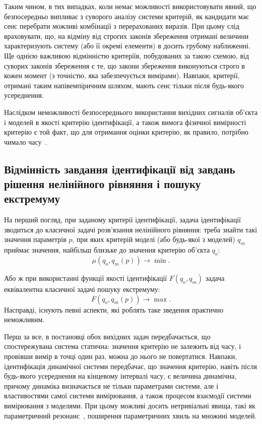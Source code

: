 Таким чином, в тих випадках, коли немає можливості
використовувати явний, що безпосередньо випливає з суворого
аналізу системи критерій, як кандидати має сенс перебрати
можливі комбінації з перерахованих виразів. При цьому слід
враховувати, що, на відміну від строгих законів збереження
отримані величини характеризують систему (або її окремі
елементи) в досить грубому наближенні. Ще однією важливою
відмінністю критеріїв, побудованих за такою схемою, від суворих
законів збереження є те, що закони збереження виконуються строго
в кожен момент (з точністю, яка забезпечується вимірами). Навпаки,
критерії, отримані таким напівемпіричним шляхом, мають сенс
тільки після будь-якого усереднення.

Наслідком неможливості безпосереднього використання вихідних
сигналів об'єкта і моделей в якості критерію ідентифікації,
а також вимога фізичної вимірності критерію є той факт, що
для отримання оцінки критерію, як правило, потрібно чимало
часу~\cite{atu_ich2011, atu_DSMP2016}.



\subsection{Відмінність завдання ідентифікації від завдань рішення нелінійного рівняння і пошуку екстремуму} %

На перший погляд, при заданому критерії ідентифікації, задача ідентифікації
зводиться до класичної задачі розв'язання нелінійного рівняння: треба знайти
такі значення параметрів $p$, при яких критерій моделі (або будь-якої з
моделей) $q_m$ приймає значення, найбільш близьке до значення критерію
об'єкта $q_o$:
\[
  \mu( q_o, q_m(p) ) \to \min.
\]

Або ж при використанні функції якості ідентифікації
$F(q_o,q_m)$ задача еквівалентна класичної задачі пошуку
екстремуму:
%
\[
  \overline{F}( q_o, q_m(p) ) \to \max.
\]
%
Насправді, існують певні аспекти, які роблять таке зведення практично
неможливим.

Перш за все, в постановці обох вихідних задач передбачається, що
спостережувана система статична: значення критерію не залежить від часу, і
провівши вимір в точці один раз, можна до нього не повертатися. Навпаки,
ідентифікація динамічної системи передбачає, що значення критерію, навіть після
будь-якого усереднення на кінцевому інтервалі часу, є величина динамічна,
причому динаміка визначається не тільки параметрами системи, але і
властивостями самої системи вимірювання, а також процесом взаємодії системи
вимірювання з моделями. При цьому можливі досить нетривіальні явища, такі як
параметричний резонанс~\cite{landau1}, поширення параметричних хвиль на множині моделей.

